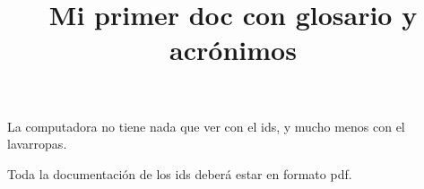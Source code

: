 \documentclass{article}
\title{Mi primer doc con glosario y acrónimos}
\begin{document}
\maketitle

La \gls{computadora} no tiene nada que ver con el \gls{ids}, y mucho menos con el \gls{lavarropas}.

\newpage
Toda la documentación de los \gls{ids} deberá estar en formato \gls{pdf}.

\newpage
\printglossary[type=main]
\newpage
\printglossary[type=\acronymtype]
\end{document}
